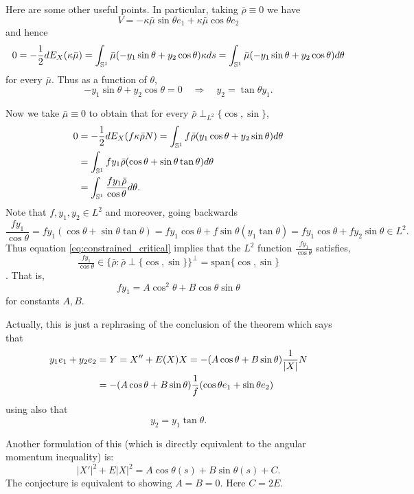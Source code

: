 \documentclass[12pt]{article}
\begin{document}
\begin{rem}
{\color{red} Here are some other useful points.}
In particular, taking \(\bar{\rho} \equiv 0\) we have
\[
V = -\kappa\bar{\mu}\sin\theta e_1 + \kappa\bar{\mu}\cos\theta e_2
\]
and hence
\[
0 = -\frac{1}{2} dE_X(\kappa\bar{\mu}) = \int_{\operatorname{\mathbb{S}^1}} \bar{\mu}(-y_1 \sin\theta + y_2 \cos\theta) \kappa ds = \int_{\operatorname{\mathbb{S}^1}} \bar{\mu}(-y_1 \sin\theta + y_2 \cos\theta) d\theta
\]
for every \(\bar{\mu}\). Thus as a function of \(\theta\),
\[
-y_1 \sin\theta + y_2 \cos\theta = 0 \quad \Rightarrow \quad y_2 = \tan\theta y_1.
\]

Now we take \(\bar{\mu} \equiv 0\) to obtain that for every \(\bar{\rho} \perp_{L^2} \{\cos,\sin\}\),
\begin{equation}
\label{eq:constrained_critical}
\begin{split}
0 &= -\frac{1}{2} dE_X(f\kappa\bar{\rho} N) = \int_{\operatorname{\mathbb{S}^1}} f\bar{\rho}(y_1 \cos\theta + y_2 \sin\theta) d\theta \\
&= \int_{\operatorname{\mathbb{S}^1}} f y_1 \bar{\rho}(\cos\theta + \sin\theta\tan\theta) d\theta \\
&= \int_{\operatorname{\mathbb{S}^1}} \frac{f y_1 \bar{\rho}}{\cos\theta} d\theta.
\end{split}
\end{equation}
Note that \(f, y_1, y_2 \in L^2\) and moreover, going backwards
\[
\frac{f y_1}{\cos\theta} = f y_1 (\cos\theta + \sin\theta\tan\theta) = f y_1 \cos\theta + f\sin\theta (y_1 \tan\theta) = f y_1 \cos\theta + fy_2 \sin\theta \in L^2.
\]
Thus equation \eqref{eq:constrained_critical} implies that the \(L^2\) function \(\tfrac{f y_1}{\cos\theta}\) satisfies,
\[
\tfrac{f y_1}{\cos\theta} \in \{\bar{\rho} : \bar{\rho} \perp \{\cos, \sin\}\}^{\perp} = \text{span} \{\cos, \sin\}
\].
That is,
\[
f y_1 = A \cos^2 \theta + B \cos\theta\sin\theta
\]
for constants \(A, B\).

Actually, this is just a rephrasing of the conclusion of the theorem which says that
\begin{align*}
y_1 e_1 + y_2 e_2 &= Y = X'' + E(X) X = -(A \cos\theta + B \sin\theta) \frac{1}{\left|{X}\right|} N \\
& = -(A \cos\theta + B \sin\theta) \frac{1}{f} (\cos\theta e_1 + \sin \theta e_2)
\end{align*}
using also that
\[
y_2 = y_1 \tan\theta.
\]
\end{rem}

\begin{rem}
Another formulation of this (which is directly equivalent to the angular momentum inequality) is:
$$ |X'|^2  + E|X|^2= A \cos \theta(s) + B\sin\theta(s) + C.$$
The conjecture is equivalent to showing $A=B=0$.   Here $C=2E$.
\end{rem}
\end{document}
